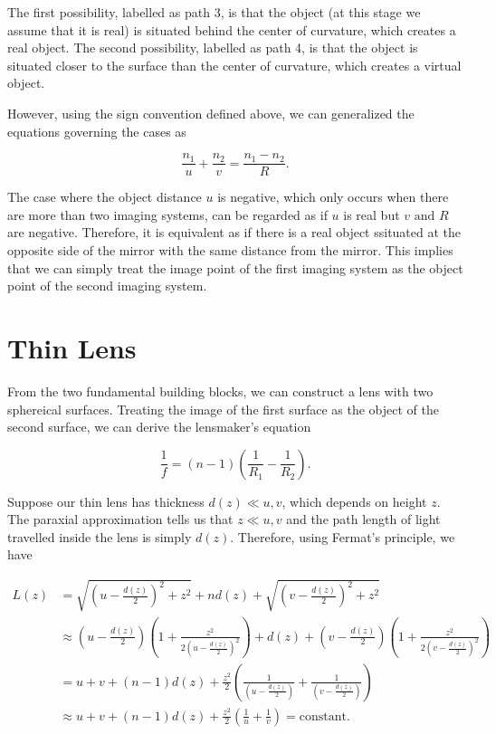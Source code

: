 \documentclass[english,a4paper,12pt]{report}
\begin{document}

The first possibility, labelled as path 3, is that the object (at this stage we assume that it is real) is situated behind the center of curvature, which creates a real object. The second possibility, labelled as path 4, is that the object is situated closer to the surface than the center of curvature, which creates a virtual object.

However, using the sign convention defined above, we can generalized the equations governing the cases as 

\begin{equation}
    \frac{n_1 }{u} + \frac{n_2 }{v} = \frac{n_1 - n_2 }{R}.
\end{equation}

The case where the object distance \(u\) is negative, which only occurs when there are more than two imaging systems, can be regarded as if \(u\) is real but \(v \text { and } R\) are negative. Therefore, it is equivalent as if there is a real object ssituated at the opposite side of the mirror with the same distance from the mirror. This implies that we can simply treat the image point of the first imaging system as the object point of the second imaging system.

\section{Thin Lens}

From the two fundamental building blocks, we can construct a lens with two sphereical surfaces. Treating the image of the first surface as the object of the second surface, we can derive the lensmaker's equation 

\begin{equation}
    \frac{1}{f} = (n-1) \left(\frac{1}{R_1 } - \frac{1}{R_2 }\right).  
\end{equation}



Suppose our thin lens has thickness \(d(z) \ll  u,v \), which depends on height \(z\). The paraxial approximation tells us that \(z \ll  u,v\) and the path length of light travelled inside the lens is simply \(d(z)\). Therefore, using Fermat's principle, we have

\begin{equation}
    \begin{aligned} 
    L(z) &= \sqrt{\left(u-\frac{d(z)}{2}\right) ^2+z^2} + nd(z) + \sqrt{\left( v-\frac{d(z)}{2}  \right)^2+z^2} \\
    &\approx  \left( u- \frac{d(z)}{2}  \right) \left( 1 + \frac{z^2}{2\left( u - \frac{d(z)}{2}  \right)^2}  \right) + d(z) + \left( v- \frac{d(z)}{2}  \right) \left( 1 + \frac{z^2}{2\left( v - \frac{d(z)}{2}  \right)^2}  \right) \\
    &= u + v + (n-1) d(z) + \frac{z^2}{2} \left( \frac{1}{\left( u-\frac{d(z)}{2}  \right)} + \frac{1}{\left( v-\frac{d(z)}{2}  \right)}  \right) \\
    &\approx u+v+(n-1)d(z) + \frac{z^2}{2}(\frac{1}{u} + \frac{1}{v}  ) = \text{constant}.  
    \end{aligned} 
\end{equation}
\end{document}
